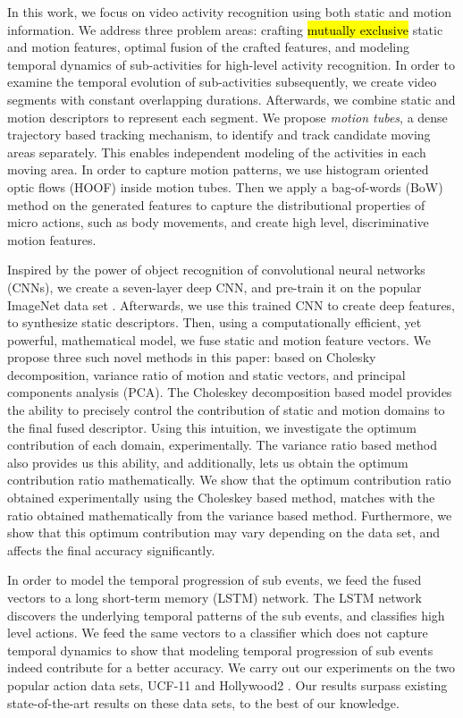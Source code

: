 In this work, we focus on video activity recognition using both static and motion information. We address three problem areas: crafting \hl{mutually exclusive} static and motion features, optimal fusion of the crafted features, and
modeling temporal dynamics of sub-activities for high-level activity recognition. In order to examine the temporal evolution
of sub-activities subsequently, we create video segments with constant overlapping durations. Afterwards, we combine static and motion
descriptors to represent each segment. We propose \textit{motion tubes},
a dense trajectory \cite{wang2011action} based tracking mechanism, to identify and track candidate moving areas
separately. This enables independent modeling of the activities in each moving area.
In order to capture motion patterns, we use histogram oriented optic flows (HOOF) \cite{chaudhry2009histograms}
inside motion tubes. Then we apply a bag-of-words (BoW) method on the generated
features to capture the distributional properties of micro actions, such as body movements, and create high level, discriminative motion features.

Inspired by the power  of object recognition of convolutional neural networks (CNNs), we create a seven-layer deep
CNN, and pre-train it on the popular ImageNet data set \cite{deng2012imagenet}.
Afterwards, we use this trained CNN to create deep features, to synthesize static descriptors.
Then, using a computationally efficient, yet powerful, mathematical model, we fuse static and motion feature vectors. We propose three such novel methods in this paper: based on
Cholesky decomposition, variance ratio of motion and static vectors, and principal components analysis (PCA). The Choleskey decomposition based model provides the ability to
precisely control the contribution of static and motion domains to the final fused descriptor. Using this intuition, we investigate the
optimum contribution of each domain, experimentally.  The variance ratio based method also provides us this ability, and additionally, lets us
obtain the optimum contribution ratio mathematically. We show that the optimum contribution ratio obtained experimentally using the Choleskey based method,
matches with the ratio obtained mathematically from the variance based method. Furthermore, we show that this optimum contribution may
vary depending on the data set, and affects the final accuracy significantly.


In order to model the temporal progression of sub events, we feed the fused vectors to
a long short-term memory (LSTM) network. The LSTM network discovers the underlying temporal patterns of the sub events, and classifies high level actions.
We feed the same vectors to a classifier which does not capture temporal dynamics to show that modeling temporal progression of sub events indeed contribute for a better
accuracy. We carry out our experiments on the two popular action data sets, UCF-11 \cite{liu2009recognizing}
and Hollywood2 \cite{marszalek2009actions}. Our results surpass existing  state-of-the-art
results on these data sets, to the best of our knowledge.

